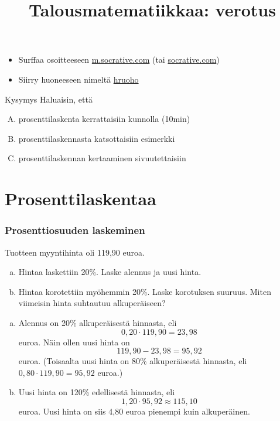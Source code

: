 \documentclass[handout]{beamer}
\title{Talousmatematiikkaa: verotus}
\newcommand{\socrativeOhje}{
\begin{itemize}
\item Surffaa osoitteeseen \url{m.socrative.com} (tai \url{socrative.com})
\item Siirry huoneeseen nimeltä \url{hruoho}
\end{itemize}
}
\begin{document}
\begin{frame}
\maketitle
\end{frame}
\begin{frame}
\tableofcontents
\end{frame}
\begin{frame}

\socrativeOhje
\begin{block}{Kysymys}
Haluaisin, että
\begin{enumerate}[(A)]
\item prosenttilaskenta kerrattaisiin kunnolla (10min)
\item prosenttilaskennasta katsottaisiin esimerkki
\item prosenttilaskennan kertaaminen sivuutettaisiin
\end{enumerate}
\end{block}
\end{frame}

\section{Prosenttilaskentaa}
\begin{frame}
\frametitle{Prosenttiosuuden laskeminen}
	\begin{esim}
		Tuotteen myyntihinta oli 119,90 euroa. 
		\begin{enumerate}[(a)]
			\item Hintaa laskettiin 20\%. Laske alennus ja uusi hinta.
			\item Hintaa korotettiin myöhemmin 20\%. Laske korotuksen suuruus. Miten viimeisin hinta suhtautuu alkuperäiseen?
		\end{enumerate}
	\end{esim}
\end{frame}
\begin{frame}
	\begin{ratkaisu}
		\begin{enumerate}[(a)]
			\item Alennus on 20\% alkuperäisestä hinnasta\pause , eli 
			\[
			0,20\cdot119,90 = 23,98
			\] euroa. \pause Näin ollen uusi hinta on 
			\[
			119,90-23,98 = 95,92
			\] euroa. \pause (Toisaalta uusi hinta on 80\% alkuperäisestä hinnasta, eli \(
			0,80\cdot 119,90 = 95,92\) euroa.)
			\item \pause Uusi hinta on 120\% edellisestä hinnasta\pause , eli
			\[
			1,20\cdot95,92\approx 115,10
			\] euroa. \pause Uusi hinta on siis 4,80 euroa pienempi kuin alkuperäinen.
		\end{enumerate}
	\end{ratkaisu}
\end{frame}
\end{document}
